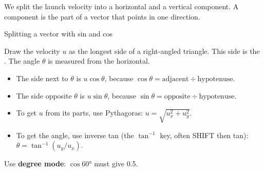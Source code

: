 We split the launch velocity into a horizontal  and a vertical component. A
component is the part of a vector that points in one direction.

\begin{toolkit}{Splitting a vector with sin and cos}
\begin{minipage}[t]{0.58\linewidth}\vspace{0pt}\RaggedRight
Draw the velocity $u$ as the longest side of a right-angled triangle. This side is the
. The angle $\theta$ is measured from the horizontal.
\begin{itemize}
  \item The side next to $\theta$ is $u\cos\theta$, because
        $\cos\theta = \text{adjacent} \div \text{hypotenuse}$.
  \item The side opposite $\theta$ is $u\sin\theta$, because
        $\sin\theta = \text{opposite} \div \text{hypotenuse}$.
  \item To get $u$ from its parts, use Pythagoras: $u = \sqrt{u_x^2 + u_y^2}$.
  \item To get the angle, use inverse tan (the $\tan^{-1}$ key, often SHIFT then tan):
        $\theta = \tan^{-1}(u_y/u_x)$.
\end{itemize}
Use \textbf{degree mode}: $\cos\ang{60}$ must give 0.5.
\end{minipage}\hfill
\begin{minipage}[t]{0.38\linewidth}\vspace{2mm}\centering
\end{minipage}
\end{toolkit}

